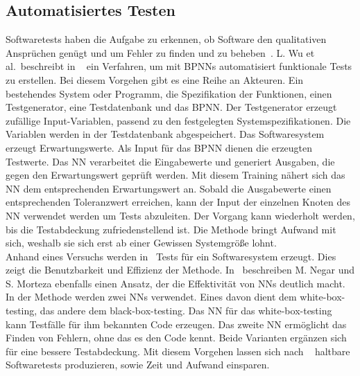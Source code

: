 \subsection{Automatisiertes Testen}
Softwaretests haben die Aufgabe zu erkennen, ob Software den qualitativen Ansprüchen genügt und um Fehler zu finden und zu beheben~\cite{Wu2008}.
L. Wu et al.~beschreibt in ~\cite{Wu2008} ein Verfahren, um mit BPNNs automatisiert funktionale Tests zu erstellen. 
Bei diesem Vorgehen gibt es eine Reihe an Akteuren. Ein bestehendes System oder Programm, die Spezifikation der Funktionen, einen Testgenerator, eine Testdatenbank und das BPNN. Der Testgenerator erzeugt zufällige Input-Variablen, passend zu den festgelegten Systemspezifikationen. Die Variablen werden in der Testdatenbank abgespeichert. Das Softwaresystem erzeugt Erwartungswerte. Als Input für das BPNN dienen die erzeugten Testwerte. Das NN verarbeitet die Eingabewerte und generiert Ausgaben, die gegen den Erwartungswert geprüft werden.
Mit diesem Trai\-ning nähert sich das NN dem entsprechenden Erwartungswert an.
Sobald die Ausgabewerte einen entsprechenden Toleranzwert erreichen, kann der Input der einzelnen Knoten des NN verwendet werden um Tests abzuleiten. Der Vorgang kann wiederholt werden, bis die Testabdeckung zufriedenstellend ist. Die Methode bringt Aufwand mit sich, weshalb sie sich erst ab einer Gewissen Systemgröße lohnt.\\
Anhand eines Versuchs werden in~\cite{Wu2008} Tests für ein Softwaresystem erzeugt. Dies zeigt die Benutzbarkeit und Effizienz der Methode.
\noindent In~\cite{Majma2014} beschreiben M. Negar und S. Morteza ebenfalls einen Ansatz, der die Effektivität von NNs deutlich macht. In der Methode werden zwei NNs verwendet. Eines davon dient dem white-box-testing, das andere dem black-box-testing. Das NN für das white-box-testing kann Testfälle für ihm bekannten Code erzeugen. Das zweite NN ermöglicht das Finden von Fehlern, ohne das es den Code kennt. Beide Varianten ergänzen sich für eine bessere Testabdeckung. Mit diesem Vorgehen lassen sich nach ~\cite{Majma2014} haltbare Softwaretests produzieren, sowie Zeit und Aufwand einsparen.

